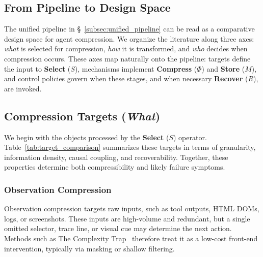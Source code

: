 \subsection{From Pipeline to Design Space}
\label{subsec:design_space}

\newcommand{\compacteq}[1]{%
{\setlength{\abovedisplayskip}{3pt}%
\setlength{\belowdisplayskip}{3pt}%
\setlength{\abovedisplayshortskip}{1pt}%
\setlength{\belowdisplayshortskip}{1pt}%
\[
#1
\]}}



The unified pipeline in \S~\ref{subsec:unified_pipeline} can be read as a comparative design space for agent compression. We organize the literature along three axes: \textit{what} is selected for compression, \textit{how} it is transformed, and \textit{who} decides when compression occurs. These axes map naturally onto the pipeline: targets define the input to \textbf{Select} ($S$), mechanisms implement \textbf{Compress} ($\Phi$) and \textbf{Store} ($M$), and control policies govern when these stages, and when necessary \textbf{Recover} ($R$), are invoked.
\vspace{0.8em}


\subsection{Compression Targets (\textit{What})}
\label{subsec:compressin_target}

We begin with the objects processed by the \textbf{Select} ($S$) operator. Table~\ref{tab:target_comparison} summarizes these targets in terms of granularity, information density, causal coupling, and recoverability. Together, these properties determine both compressibility and likely failure symptoms.

\subsubsection{Observation Compression}
Observation compression targets raw inputs, such as tool outputs, HTML DOMs, logs, or screenshots. These inputs are high-volume and redundant, but a single omitted selector, trace line, or visual cue may determine the next action. Methods such as The Complexity Trap~\citep{lindenbauer2025complexitytrapsimpleobservation} therefore treat it as a low-cost front-end intervention, typically via masking or shallow filtering.

